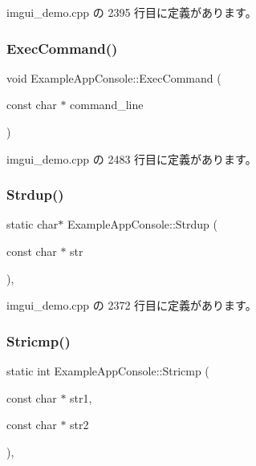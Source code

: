  imgui\+\_\+demo.\+cpp の 2395 行目に定義があります。

\mbox{\label{struct_example_app_console_aa1e8bf1f3795cbc41597e1ff081c6589}} 
\subsubsection{\texorpdfstring{Exec\+Command()}{ExecCommand()}}
{\footnotesize\ttfamily void Example\+App\+Console\+::\+Exec\+Command (\begin{DoxyParamCaption}\item[{const char $\ast$}]{command\+\_\+line }\end{DoxyParamCaption})\hspace{0.3cm}{\ttfamily [inline]}}



 imgui\+\_\+demo.\+cpp の 2483 行目に定義があります。

\mbox{\label{struct_example_app_console_a61d0da41ef31ea8690b23681a1e54dba}} 
\subsubsection{\texorpdfstring{Strdup()}{Strdup()}}
{\footnotesize\ttfamily static char$\ast$ Example\+App\+Console\+::\+Strdup (\begin{DoxyParamCaption}\item[{const char $\ast$}]{str }\end{DoxyParamCaption})\hspace{0.3cm}{\ttfamily [inline]}, {\ttfamily [static]}}



 imgui\+\_\+demo.\+cpp の 2372 行目に定義があります。

\mbox{\label{struct_example_app_console_a6e5e5d66e77618eff0f89785261c9391}} 
\subsubsection{\texorpdfstring{Stricmp()}{Stricmp()}}
{\footnotesize\ttfamily static int Example\+App\+Console\+::\+Stricmp (\begin{DoxyParamCaption}\item[{const char $\ast$}]{str1,  }\item[{const char $\ast$}]{str2 }\end{DoxyParamCaption})\hspace{0.3cm}{\ttfamily [inline]}, {\ttfamily [static]}}



